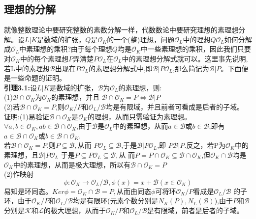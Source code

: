 \documentclass[UTF8]{article}
\begin{document}
    \subsection{理想的分解}
    就像整数理论中要研究整数的素数分解一样，代数数论中要研究理想的素理想分解。设$L|K$是数域的扩张，$Q$是$\mathcal{O}_{K}$的一个(整)理想，问题$\mathcal{O}_{L}$中的理想$Q\mathcal{O}_{L}$如何分解成$\mathcal{O}_{L}$中素理想的乘积?由于每个理想$Q$均是$\mathcal{O}_{K}$中一些素理想的乘积，因此我们只要对$\mathcal{O}_{K}$中的每个素理想$P$弄清楚$P\mathcal{O}_{L}$在$\mathcal{O}_{L}$中的素理想分解式就可以。这里事先说明,若L中的素理想$\mathcal{B}$出现在$P\mathcal{O}_{L}$的素理想分解式中,即$\mathcal{B}|P\mathcal{O}_{L}$,那么简记为$\mathcal{B}|P$。下面便是一些命题的证明。\\
    \textbf{引理3.1:}设$L|K$是数域的扩张，$\mathcal{B}$为$\mathcal{O}_{L}$的素理想，则:\\
    (1)$\mathcal{B}\cap \mathcal{O}_{K}$为$\mathcal{O}_{K}$的素理想，并且
    $\mathcal{B}\cap \mathcal{O}_{K}=P \Leftrightarrow \mathcal{B}|P$\\
    (2)若$\mathcal{B}\cap \mathcal{O}_{K}=P$,则$\mathcal{O}_{K}/P$和$\mathcal{O}_{L}/\mathcal{B}$均是有限域，并且前者可看成是后者的子域。\\
    证明:(1)易验证$\mathcal{B}\cap \mathcal{O}_{K}$是$\mathcal{O}_{K}$的理想，从而只需验证为素理想。$\forall a,b\in \mathcal{O}_{K},ab\in \mathcal{B}\cap \mathcal{O}_{K}$,由于$\mathcal{B}$是$\mathcal{O}_{L}$中的素理想，从而$a\in \mathcal{B}$或$b\in\mathcal{B}$,即有$a\in \mathcal{B}\cap \mathcal{O}_{K}$或$b\in \mathcal{B}\cap \mathcal{O}_{K}$.\\
    若$\mathcal{B}\cap \mathcal{O}_{K}=P$,则$P\subseteq \mathcal{B},$从而
    $P\mathcal{O}_{L}\subseteq \mathcal{B}$,于是$\mathcal{B}| P\mathcal{O}_{L}$,即
    $P\mathcal{B}|P$.反之，若P为$\mathcal{O}_{K}$中的素理想，且$\mathcal{B}| P\mathcal{O}_{L}$
    于是$P\subseteq  P\mathcal{O}_{L}\subseteq \mathcal{B},$从
    而$P=P\cap \mathcal{O}_{K}\subseteq \mathcal{B}\cap \mathcal{O}_{K}$,但$\mathcal{O}_{K}\cap\mathcal{B}$均是$\mathcal{O}_{K}$中的素理想，从而是极大理想，所以有$\mathcal{B}\cap \mathcal{O}_{K}=P$\\
    (2)作映射$$
    \phi:\mathcal{O}_{K}\rightarrow \mathcal{O}_{L}/\mathcal{B},\phi(x)=x+\mathcal{B}(x\in \mathcal{O}_{K})
    $$
    易知是环同态。$Ker\phi=\mathcal{O}_{K}\cap \mathcal{B}=P,$从而由同态$\phi$可将环$\mathcal{O}_{K}/P$看成是$\mathcal{O}_{L}/\mathcal{B}$
    的子环，由于$\mathcal{O}_{K}/P$和$\mathcal{O}_{L}/\mathcal{B}$均是有限环(元素个数分别是$N_{K}(P),N_{L}(\mathcal{B})$),由于$P$和$\mathcal{B}$分别是$\mathcal{K}$和$\mathcal{L}$的极大理想，从而于$\mathcal{O}_{K}/P$和$\mathcal{O}_{L}/\mathcal{B}$是有限域，前者是后者的子域。\\
\end{document}
